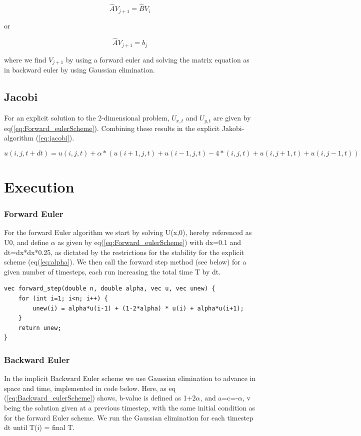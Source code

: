 \documentclass[a4paper,10pt]{article}
\begin{document}
\begin{equation}
 \hat{A}V_{j+1} = \hat{B}V_{i}
\end{equation}

or

\begin{equation}
 \hat{A}V_{j+1} = b_{j}
\end{equation}

where we find $V_{j+1}$ by using a forward euler and solving the matrix equation as in backward euler by using Gaussian elimination. 

\subsection{Jacobi}
For an explicit solution to the 2-dimensional problem, $U_{x,t}$ and $U_{y,t}$ are given by eq(\ref{eq:Forward_eulerScheme}). Combining these results in the explicit Jakobi-algorithm (\ref{eq:jacobi}).

\begin{equation}
  u(i,j,t+dt) = u(i,j,t) + \alpha*(u(i+1,j,t) + u(i-1,j,t) - 4*(i,j,t) + u(i,j+1,t) +
      
      u(i,j-1,t))
\label{eq:jacobi}
\end{equation}

\section{Execution}

\subsubsection{Forward Euler}
For the forward Euler algorithm we start by solving U(x,0), hereby referenced as U0, and define $\alpha$ as given by eq(\ref{eq:Forward_eulerScheme}) with dx=0.1 and dt=dx*dx*0.25, as dictated by the
restrictions for the stability for the explicit scheme (eq(\ref{eq:alpha}). We then call the forward step method (see below) for a given number of timesteps, each run increasing the total time T by dt.
\begin{verbatim}
vec forward_step(double n, double alpha, vec u, vec unew) {
    for (int i=1; i<n; i++) {
        unew(i) = alpha*u(i-1) + (1-2*alpha) * u(i) + alpha*u(i+1);
    }
    return unew;
} 
\end{verbatim}

\subsubsection{Backward Euler}
In the implicit Backward Euler scheme we use Gaussian elimination to advance in space and time, implemented in code below. Here, as eq (\ref{eq:Backward_eulerScheme}) shows, b-value is defined as
1+2$\alpha$, and a=c=-$\alpha$, v being the solution given at a previous timestep, with the same initial condition as for the forward Euler scheme. We run the Gaussian elimination for each timestep dt until T(i) = final T.
\end{document}
